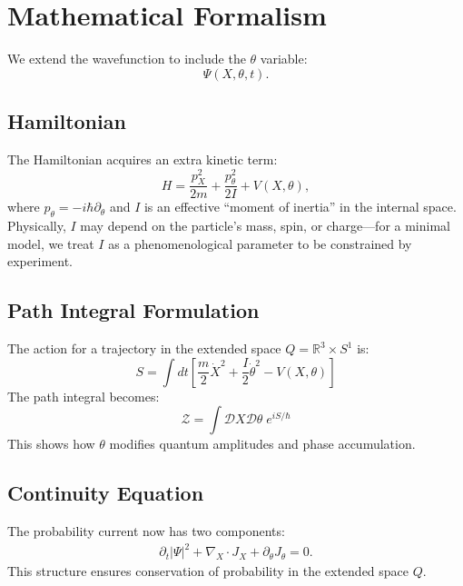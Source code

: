 
\section{Mathematical Formalism}

We extend the wavefunction to include the $\theta$ variable:
\begin{equation}
\Psi(X, \theta, t).
\end{equation}

\subsection{Hamiltonian}
The Hamiltonian acquires an extra kinetic term:
\begin{equation}
H = \frac{p_X^2}{2m} + \frac{p_\theta^2}{2I} + V(X,\theta),
\end{equation}
where $p_\theta = -i\hbar \partial_\theta$ and $I$ is an effective ``moment of inertia'' in the internal space. Physically, $I$ may depend on the particle's mass, spin, or charge---for a minimal model, we treat $I$ as a phenomenological parameter to be constrained by experiment.

\subsection{Path Integral Formulation}
The action for a trajectory in the extended space $Q = \mathbb{R}^3 \times S^1$ is:
\begin{equation}
S = \int dt \left[ \frac{m}{2} \dot{X}^2 + \frac{I}{2} \dot{\theta}^2 - V(X,\theta) \right]
\end{equation}
The path integral becomes:
\begin{equation}
\mathcal{Z} = \int \mathcal{D}X \mathcal{D}\theta \; e^{iS/\hbar}
\end{equation}
This shows how $\theta$ modifies quantum amplitudes and phase accumulation.

\subsection{Continuity Equation}
The probability current now has two components:
\begin{align}
\partial_t |\Psi|^2 + \nabla_X \cdot J_X + \partial_\theta J_\theta = 0.
\end{align}
This structure ensures conservation of probability in the extended space $Q$.
